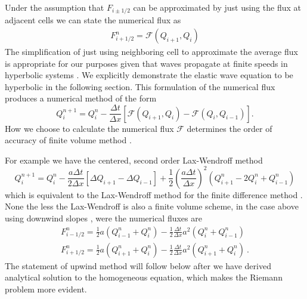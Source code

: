 \documentclass[review,onefignum,onetabnum]{siamart171218}
\begin{document}
Under the assumption that $F_{i \pm 1/2}$ can be approximated by just using the flux at adjacent cells we can state the numerical flux as
\begin{align}
    F_{i + 1/2}^n = \mathcal{F} \left( Q_{i+1}, Q_{i} \right)
\end{align}
The simplification of just using neighboring cell to approximate the average flux is appropriate for our purposes given that waves propagate at finite speeds in hyperbolic systems \cite{leveque_2002}. We explicitly demonstrate the elastic wave equation to be hyperbolic in the following section. 
This formulation of the numerical flux produces a numerical method of the form
\begin{equation}
     Q_i^{n+1}  = Q_i^{n} - \frac{\Delta t}{\Delta x} \left[ \mathcal{F}(Q_{i+1},Q_i) - \mathcal{F}(Q_i,Q_{i-1}) \right].
     \label{eq:finitvolumebase}
\end{equation}
How we choose to calculate the numerical flux $\mathcal{F}$ determines the order of accuracy of finite volume method \cite{leveque_2002}. 

For example we have the centered, second order Lax-Wendroff method
\begin{equation}
      Q_i^{n+1} = Q_i^{n} - \frac{a \Delta t}{2 \Delta x} \left[\Delta Q_{i+1} - \Delta Q_{i-1} \right] + \frac{1}{2} \left( \frac{ a\Delta t}{\Delta x}\right)^2 \left(Q_{i+1}^n - 2Q_i^n + Q^n_{i-1}\right)
\end{equation}  
which is equivalent to the Lax-Wendroff method for the finite difference method \cite{comp_seis}. None the less the Lax-Wendroff is also a finite volume scheme, in the case above using downwind slopes \cite{comp_seis}, were the numerical fluxes are
\begin{equation}
\begin{gathered}
    F_{i-1/2}^n = \frac{1}{2} a (Q_{i-1}^n + Q_i^n) - \frac{1}{2} \frac{\Delta t}{\Delta x} a^2 (Q_i^n + Q^n_{i-1}) \\
    F_{i+1/2}^n = \frac{1}{2} a (Q_{i+1}^n + Q_i^n) - \frac{1}{2} \frac{\Delta t}{\Delta x} a^2 (Q_{i+1}^n + Q^n_{i}) \: .
\end{gathered}
\end{equation}
The statement of upwind method will follow below after we have derived analytical solution to the homogeneous equation, which makes the Riemann problem more evident. 
\end{document}
